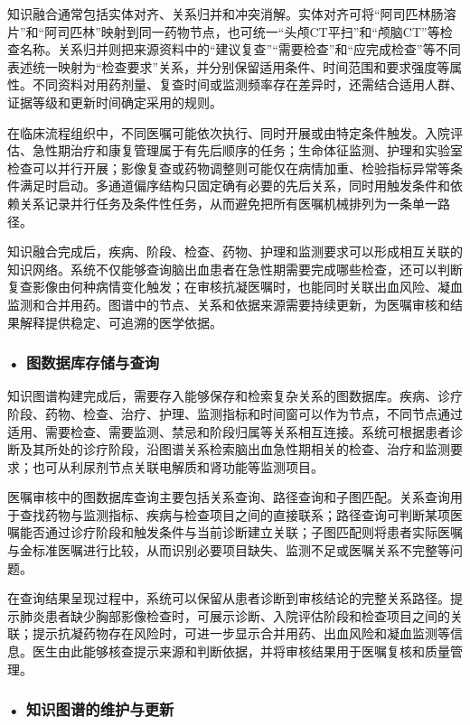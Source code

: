 知识融合通常包括实体对齐、关系归并和冲突消解。实体对齐可将“阿司匹林肠溶片”和“阿司匹林”映射到同一药物节点，也可统一“头颅CT平扫”和“颅脑CT”等检查名称。关系归并则把来源资料中的“建议复查”“需要检查”和“应完成检查”等不同表述统一映射为“检查要求”关系，并分别保留适用条件、时间范围和要求强度等属性。不同资料对用药剂量、复查时间或监测频率存在差异时，还需结合适用人群、证据等级和更新时间确定采用的规则。

在临床流程组织中，不同医嘱可能依次执行、同时开展或由特定条件触发。入院评估、急性期治疗和康复管理属于有先后顺序的任务；生命体征监测、护理和实验室检查可以并行开展；影像复查或药物调整则可能仅在病情加重、检验指标异常等条件满足时启动。多通道偏序结构只固定确有必要的先后关系，同时用触发条件和依赖关系记录并行任务及条件性任务，从而避免把所有医嘱机械排列为一条单一路径。

知识融合完成后，疾病、阶段、检查、药物、护理和监测要求可以形成相互关联的知识网络。系统不仅能够查询脑出血患者在急性期需要完成哪些检查，还可以判断复查影像由何种病情变化触发；在审核抗凝医嘱时，也能同时关联出血风险、凝血监测和合并用药。图谱中的节点、关系和依据来源需要持续更新，为医嘱审核和结果解释提供稳定、可追溯的医学依据。
\subsubsection*{\textbf{• 图数据库存储与查询}}

知识图谱构建完成后，需要存入能够保存和检索复杂关系的图数据库。疾病、诊疗阶段、药物、检查、治疗、护理、监测指标和时间窗可以作为节点，不同节点通过适用、需要检查、需要监测、禁忌和阶段归属等关系相互连接。系统可根据患者诊断及其所处的诊疗阶段，沿图谱关系检索脑出血急性期相关的检查、治疗和监测要求；也可从利尿剂节点关联电解质和肾功能等监测项目。

医嘱审核中的图数据库查询主要包括关系查询、路径查询和子图匹配。关系查询用于查找药物与监测指标、疾病与检查项目之间的直接联系；路径查询可判断某项医嘱能否通过诊疗阶段和触发条件与当前诊断建立关联；子图匹配则将患者实际医嘱与金标准医嘱进行比较，从而识别必要项目缺失、监测不足或医嘱关系不完整等问题。

在查询结果呈现过程中，系统可以保留从患者诊断到审核结论的完整关系路径。提示肺炎患者缺少胸部影像检查时，可展示诊断、入院评估阶段和检查项目之间的关联；提示抗凝药物存在风险时，可进一步显示合并用药、出血风险和凝血监测等信息。医生由此能够核查提示来源和判断依据，并将审核结果用于医嘱复核和质量管理。

\subsubsection*{\textbf{• 知识图谱的维护与更新}}

